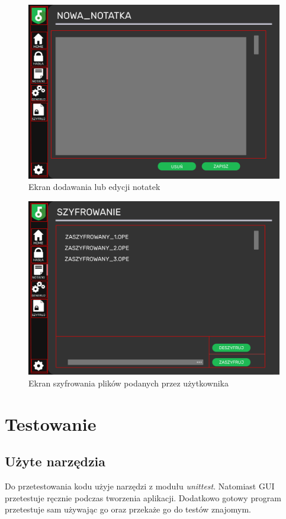 \documentclass[a4paper]{article}
\begin{document}
\begin{figure}[H]
    \centering
    \includegraphics[width=1\textwidth]{img/ekran_nowej_not.png}
    \caption{Ekran dodawania lub edycji notatek}
    \label{fig:notatkNowe}
\end{figure}

\begin{figure}[H]
    \centering
    \includegraphics[width=1\textwidth]{img/ekran_szyfrowania.png}
    \caption{Ekran szyfrowania plików podanych przez użytkownika}
    \label{fig:szyfrowanie}
\end{figure}



\section{Testowanie}
\subsection{Użyte narzędzia}
Do przetestowania kodu użyje narzędzi z modułu \textit{unittest}. Natomiast GUI przetestuje ręcznie podczas tworzenia aplikacji. Dodatkowo gotowy program przetestuje sam używając go oraz przekaże go do testów znajomym.
\end{document}
